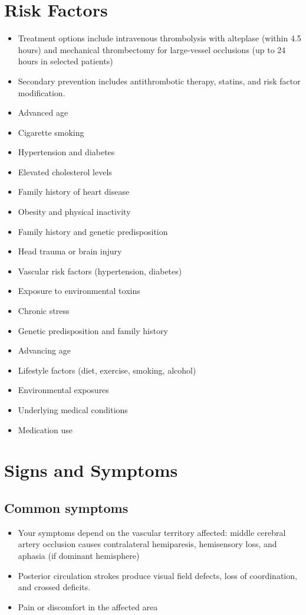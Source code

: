 \section{Risk Factors}
\begin{itemize}[noitemsep]
  \item Treatment options include intravenous thrombolysis with alteplase (within 4.5 hours) and mechanical thrombectomy for large-vessel occlusions (up to 24 hours in selected patients)
  \item Secondary prevention includes antithrombotic therapy, statins, and risk factor modification.
  \item Advanced age
  \item Cigarette smoking
  \item Hypertension and diabetes
  \item Elevated cholesterol levels
  \item Family history of heart disease
  \item Obesity and physical inactivity
  \item Family history and genetic predisposition
  \item Head trauma or brain injury
  \item Vascular risk factors (hypertension, diabetes)
  \item Exposure to environmental toxins
  \item Chronic stress
  \item Genetic predisposition and family history
  \item Advancing age
  \item Lifestyle factors (diet, exercise, smoking, alcohol)
  \item Environmental exposures
  \item Underlying medical conditions
  \item Medication use
\end{itemize}
\section{Signs and Symptoms}

\subsection{Common symptoms}
\begin{itemize}[noitemsep]
  \item Your symptoms depend on the vascular territory affected: middle cerebral artery occlusion causes contralateral hemiparesis, hemisensory loss, and aphasia (if dominant hemisphere)
  \item Posterior circulation strokes produce visual field defects, loss of coordination, and crossed deficits.
  \item Pain or discomfort in the affected area
  \end{itemize}

